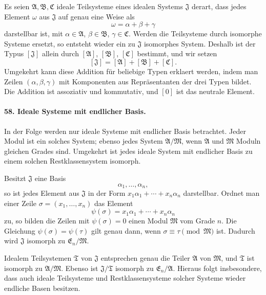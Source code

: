 \documentclass[11pt]{article}
\begin{document}
Es seien $\mathfrak A,\mathfrak B,\mathfrak C$ ideale Teilsysteme eines idealen Systems $\mathfrak J$ derart, dass jedes Element $\omega$ aus $\mathfrak J$ auf genau eine Weise als
\begin{equation}
  \omega=\alpha+\beta+\gamma
\tag{94}
\end{equation}
darstellbar ist, mit $\alpha\in\mathfrak A$, $\beta\in\mathfrak B$, $\gamma\in\mathfrak C$. Werden die Teilsysteme durch isomorphe Systeme ersetzt, so entsteht wieder ein zu $\mathfrak J$ isomorphes System. Deshalb ist der Typus $[\mathfrak J]$ allein durch $[\mathfrak A]$, $[\mathfrak B]$, $[\mathfrak C]$ bestimmt, und wir setzen
\[
  [\mathfrak J]=[\mathfrak A]+[\mathfrak B]+[\mathfrak C].
\]
Umgekehrt kann diese Addition für beliebige Typen erklaert werden, indem man Zeilen $(\alpha,\beta,\gamma)$ mit Komponenten aus Repräsentanten der drei Typen bildet. Die Addition ist assoziativ und kommutativ, und $[0]$ ist das neutrale Element.

\paragraph{58. Ideale Systeme mit endlicher Basis.}
In der Folge werden nur ideale Systeme mit endlicher Basis betrachtet. Jeder Modul ist ein solches System; ebenso jedes System $\mathfrak A/\mathfrak M$, wenn $\mathfrak A$ und $\mathfrak M$ Moduln gleichen Grades sind. Umgekehrt ist jedes ideale System mit endlicher Basis zu einem solchen Restklassensystem isomorph.

Besitzt $\mathfrak J$ eine Basis
\begin{equation}
  \alpha_1,\ldots,\alpha_n,
\tag{95}
\end{equation}
so ist jedes Element aus $\mathfrak J$ in der Form $x_1\alpha_1+\cdots+x_n\alpha_n$ darstellbar. Ordnet man einer Zeile $\sigma=(x_1,
\ldots,x_n)$ das Element
\[
  \psi(\sigma)=x_1\alpha_1+\cdots+x_n\alpha_n
\]
zu, so bilden die Zeilen mit $\psi(\sigma)=0$ einen Modul $\mathfrak M$ vom Grade $n$. Die Gleichung $\psi(\sigma)=\psi(\tau)$ gilt genau dann, wenn $\sigma\equiv\tau\pmod{\mathfrak M}$ ist. Dadurch wird $\mathfrak J$ isomorph zu $\mathfrak E_n/\mathfrak M$.

Idealem Teilsystemen $\mathfrak T$ von $\mathfrak J$ entsprechen genau die Teiler $\mathfrak A$ von $\mathfrak M$, und $\mathfrak T$ ist isomorph zu $\mathfrak A/\mathfrak M$. Ebenso ist $\mathfrak J/\mathfrak T$ isomorph zu $\mathfrak E_n/\mathfrak A$. Hieraus folgt insbesondere, dass auch ideale Teilsysteme und Restklassensysteme solcher Systeme wieder endliche Basen besitzen.
\end{document}
